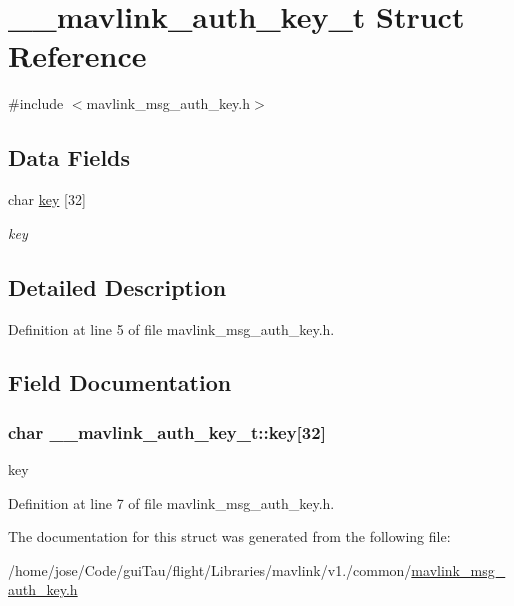 \hypertarget{struct____mavlink__auth__key__t}{\section{\-\_\-\-\_\-mavlink\-\_\-auth\-\_\-key\-\_\-t Struct Reference}
\label{struct____mavlink__auth__key__t}
}


{\ttfamily \#include $<$mavlink\-\_\-msg\-\_\-auth\-\_\-key.\-h$>$}

\subsection*{Data Fields}
\begin{DoxyCompactItemize}
\item 
char \hyperlink{struct____mavlink__auth__key__t_a3af4c05cfbd8d329c8c3a73e7a726cdc}{key} \mbox{[}32\mbox{]}
\begin{DoxyCompactList}\small\item\em key \end{DoxyCompactList}\end{DoxyCompactItemize}


\subsection{Detailed Description}


Definition at line 5 of file mavlink\-\_\-msg\-\_\-auth\-\_\-key.\-h.



\subsection{Field Documentation}
\hypertarget{struct____mavlink__auth__key__t_a3af4c05cfbd8d329c8c3a73e7a726cdc}{
\subsubsection[{key}]{\setlength{\rightskip}{0pt plus 5cm}char \-\_\-\-\_\-mavlink\-\_\-auth\-\_\-key\-\_\-t\-::key\mbox{[}32\mbox{]}}}\label{struct____mavlink__auth__key__t_a3af4c05cfbd8d329c8c3a73e7a726cdc}


key 



Definition at line 7 of file mavlink\-\_\-msg\-\_\-auth\-\_\-key.\-h.



The documentation for this struct was generated from the following file\-:\begin{DoxyCompactItemize}
\item 
/home/jose/\-Code/gui\-Tau/flight/\-Libraries/mavlink/v1./common/\hyperlink{mavlink__msg__auth__key_8h}{mavlink\-\_\-msg\-\_\-auth\-\_\-key.\-h}\end{DoxyCompactItemize}
